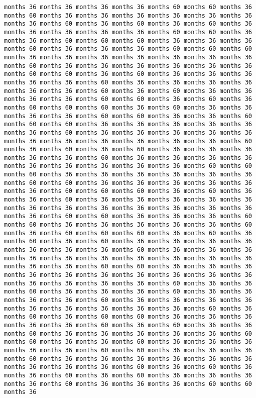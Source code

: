\documentclass[11pt]{article}
\begin{document}
\begin{Verbatim}[commandchars=\\\{\}, frame=single, framerule=2mm, rulecolor=\color{outerrorbackground}]
months 36 months 36 months 36 months 36 months 60 months 60 months 36 months 60 months 36 months 36 months 36 months 36 months 36 months 36 months 36 months 60 months 36 months 60 months 36 months 60 months 36 months 36 months 36 months 36 months 36 months 60 months 60 months 36 months 36 months 60 months 60 months 60 months 36 months 36 months 36 months 60 months 36 months 36 months 36 months 60 months 60 months 60 months 36 months 36 months 36 months 36 months 36 months 36 months 36 months 60 months 36 months 36 months 36 months 36 months 36 months 36 months 60 months 60 months 36 months 60 months 36 months 36 months 36 months 36 months 36 months 60 months 36 months 36 months 36 months 36 months 36 months 36 months 60 months 36 months 60 months 36 months 36 months 36 months 36 months 60 months 60 months 36 months 60 months 36 months 60 months 60 months 60 months 36 months 60 months 36 months 36 months 36 months 36 months 60 months 60 months 36 months 36 months 60 months 60 months 60 months 36 months 36 months 36 months 36 months 36 months 36 months 60 months 36 months 36 months 36 months 36 months 36 months 36 months 36 months 36 months 36 months 36 months 36 months 60 months 36 months 60 months 36 months 60 months 36 months 36 months 36 months 36 months 36 months 60 months 36 months 36 months 36 months 36 months 36 months 36 months 36 months 36 months 36 months 60 months 60 months 60 months 36 months 36 months 36 months 36 months 36 months 36 months 60 months 60 months 36 months 36 months 36 months 36 months 36 months 36 months 60 months 60 months 60 months 36 months 60 months 36 months 36 months 60 months 36 months 36 months 36 months 36 months 36 months 36 months 36 months 36 months 36 months 36 months 36 months 36 months 36 months 60 months 60 months 36 months 36 months 36 months 60 months 60 months 36 months 36 months 36 months 36 months 36 months 60 months 36 months 60 months 60 months 60 months 36 months 60 months 36 months 60 months 36 months 60 months 36 months 36 months 36 months 36 months 36 months 36 months 36 months 60 months 36 months 36 months 36 months 36 months 36 months 36 months 36 months 36 months 36 months 36 months 36 months 36 months 60 months 60 months 36 months 36 months 36 months 36 months 36 months 36 months 36 months 36 months 36 months 36 months 36 months 36 months 36 months 36 months 60 months 36 months 36 months 60 months 36 months 36 months 36 months 60 months 36 months 36 months 36 months 36 months 60 months 36 months 36 months 36 months 36 months 36 months 36 months 36 months 36 months 36 months 60 months 36 months 60 months 36 months 60 months 60 months 36 months 36 months 36 months 36 months 36 months 60 months 36 months 60 months 36 months 36 months 60 months 36 months 36 months 36 months 36 months 36 months 60 months 60 months 36 months 36 months 60 months 36 months 36 months 36 months 36 months 36 months 60 months 60 months 36 months 36 months 36 months 60 months 36 months 36 months 36 months 36 months 36 months 36 months 36 months 36 months 36 months 60 months 36 months 60 months 36 months 36 months 60 months 36 months 60 months 36 months 36 months 36 months 36 months 60 months 36 months 36 months 36 months 60 months 60 months 36 
\end{Verbatim}
\end{document}

